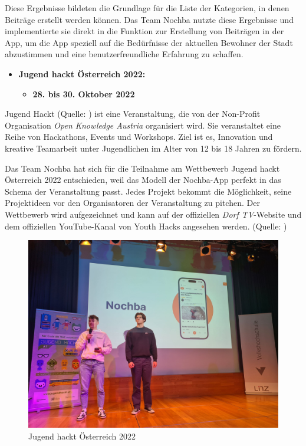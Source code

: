 Diese Ergebnisse bildeten die Grundlage für die Liste der Kategorien, in denen Beiträge erstellt werden können. Das Team Nochba nutzte diese Ergebnisse und implementierte sie direkt in die Funktion zur Erstellung von Beiträgen in der App, um die App speziell auf die Bedürfnisse der aktuellen Bewohner der Stadt abzustimmen und eine benutzerfreundliche Erfahrung zu schaffen.

\begin{itemize}
    \item \textbf{Jugend hackt Österreich 2022:}
          \begin{itemize}
              \item \textbf{28. bis 30. Oktober 2022}
          \end{itemize}
\end{itemize}

Jugend Hackt (Quelle: ) ist eine Veranstaltung, die von der Non-Profit Organisation \textit{Open Knowledge Austria} organisiert wird. Sie veranstaltet eine Reihe von Hackathons, Events und Workshops. Ziel ist es, Innovation und kreative Teamarbeit unter Jugendlichen im Alter von 12 bis 18 Jahren zu fördern.

Das Team Nochba hat sich für die Teilnahme am Wettbewerb Jugend hackt Österreich 2022 entschieden, weil das Modell der Nochba-App perfekt in das Schema der Veranstaltung passt. Jedes Projekt bekommt die Möglichkeit, seine Projektideen vor den Organisatoren der Veranstaltung zu pitchen. Der Wettbewerb wird aufgezeichnet und kann auf der offiziellen \textit{Dorf TV}-Website und dem offiziellen YouTube-Kanal von Youth Hacks angesehen werden. (Quelle: )


\begin{figure}[H]
    \centering
    \includegraphics[width=1\textwidth]{pics/JugendHackt.jpeg}
    \caption{Jugend hackt Österreich 2022}
    \label{fig:jugendHackt}
\end{figure}

